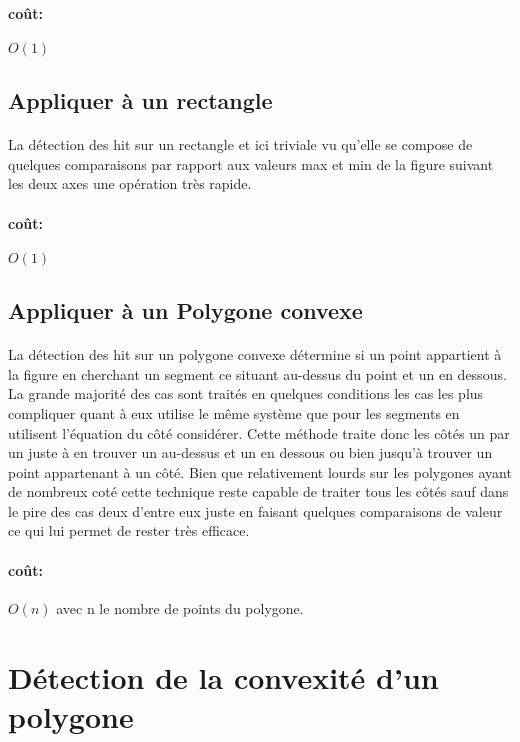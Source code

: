 \paragraph{coût: }
\(O(1)\)

\subsection{Appliquer à un rectangle}
\paragraph{}
La détection des hit sur un rectangle et ici triviale vu qu'elle se compose de quelques comparaisons par rapport aux valeurs max et min de la figure suivant les deux axes une opération très rapide.
\paragraph{coût: }
\(O(1)\)

\subsection{Appliquer à un Polygone convexe}
\paragraph{}
La détection des hit sur un polygone convexe détermine si un point appartient à la figure en cherchant un segment ce situant au-dessus du point et un en dessous. La grande majorité des cas sont traités en quelques conditions les cas les plus compliquer quant à eux utilise le même système que pour les segments en utilisent l'équation du côté considérer. Cette méthode traite donc les côtés un par un juste à en trouver un au-dessus et un en dessous ou bien jusqu’à trouver un point appartenant à un côté. Bien que relativement lourds sur les polygones ayant de nombreux coté cette technique reste capable de traiter tous les côtés sauf dans le pire des cas deux d'entre eux juste en faisant quelques comparaisons de valeur ce qui lui permet de rester très efficace.
\paragraph{coût: }
\(O(n)\) avec n le nombre de points du polygone.

\section{Détection de la convexité d'un polygone}
